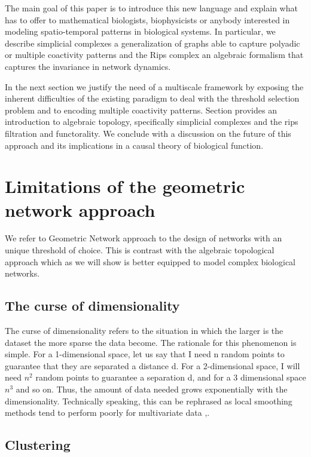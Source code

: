 \documentclass[onecollarge,runningheads]{svjour2}
\begin{document}
The main goal of this paper is to introduce this new language and explain what has to offer to mathematical biologists, biophysicists or anybody interested in modeling spatio-temporal patterns in biological systems.
In particular, we describe simplicial complexes a generalization of graphs able to capture polyadic or multiple coactivity patterns and the Rips complex an algebraic formalism that captures the invariance in network dynamics.

In the next section we justify the need of a multiscale framework by exposing the inherent difficulties of the existing paradigm to deal with the threshold selection problem and to encoding multiple coactivity patterns.
Section provides an introduction to algebraic topology, specifically simplicial complexes and the rips filtration and functorality.
We conclude with a discussion on the future of this approach and its implications in a causal theory of biological function.


\section{Limitations of the geometric network approach}
We refer to Geometric Network approach to the design of networks with an unique threshold of choice. This is contrast with the algebraic topological approach which as we will show is better equipped to model complex biological networks. 

\subsection{The curse of dimensionality}
The curse of dimensionality refers to the situation in which the larger is the dataset the more sparse the data become. The rationale for this phenomenon is simple. For a 1-dimensional space, let us say that I need n random points to guarantee that they are separated a distance d. For a 2-dimensional space, I will need $n^2$ random points to guarantee a separation d, and for a 3 dimensional space $n^3$ and so on. Thus, the amount of data needed grows exponentially with the dimensionality. Technically speaking, this can be rephrased as local smoothing methods tend to perform poorly for multivariate data \citep{stone1982optimal},\citep{lavergne2008breaking}.  

\subsection{Clustering}
\end{document}
